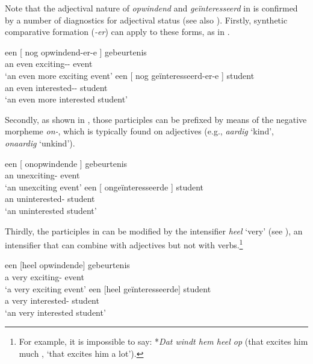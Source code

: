 \documentclass[output=paper]{langsci/langscibook}
\begin{document}
Note that the adjectival nature of \emph{opwindend} and \emph{geïnteresseerd}
in  is confirmed by a number of diagnostics for adjectival
status (see also \citealt{Broekhuis2013}). Firstly, synthetic comparative
formation (\emph{-er}) can apply to these forms, as in .

\ea%
    \label{ex:key:18.27}
	\ea
	\gll  een [ nog    opwindend-er-e ]            gebeurtenis\\
    an {} even    exciting-\Cmpr-\Agr{} {} event\\
	\glt ‘an even more exciting event’
	\ex
	\gll  een  [ nog  geïnteresseerd-er-e ]        student\\
    an {} even  interested-\Cmpr-\Agr{} {}  student\\
	\glt ‘an even more interested student’
	\z
\z

Secondly, as shown in , those participles can be prefixed by
means of the negative morpheme \emph{on-}, which is typically found on
adjectives (e.g., \emph{aardig} \enquote*{kind}, \emph{onaardig}
\enquote*{unkind}).\newpage

\ea%
    \label{ex:key:18.28}
	\ea
	\gll  een [ onopwindende ]  gebeurtenis\\
    an {} unexciting-\Agr{} {}   event\\
	\glt ‘an unexciting event’
	\ex
	\gll  een [ ongeïnteresseerde ]  student\\
    an {} uninterested-\Agr{} {}   student\\
	\glt ‘an uninterested student’
	\z
\z

Thirdly, the participles in  can be modified by the intensifier
\emph{heel} ‘very’ (see ), an intensifier that can combine with
adjectives but not with verbs.\footnote{For example, it is impossible to say:
*\emph{Dat windt hem heel op} (that excites him much \Ptcl{},
\enquote*{that excites him a lot}).}

\ea%
    \label{ex:key:18.29}
	\ea
	\gll een    [heel  opwindende]  gebeurtenis\\
		 a        very    exciting-\Agr{}  event\\
	\glt ‘a very exciting event’
	\ex
	\gll  een    [heel  geïnteresseerde]  student\\
		a        very    interested-\Agr{}      student\\
	\glt ‘an very interested student’
	\z
\z
\end{document}
